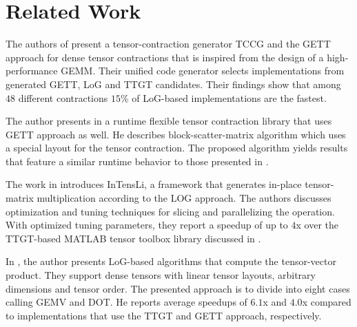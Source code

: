 \section{Related Work}
\label{sec:related}

\begin{comment}
The authors in \cite{dinapoli:2014:towards.efficient.use} discuss the efficient tensor contractions with highly optimized BLAS. 
Based on the LoG approach, they define requirements for the use of \tf{gemm} for class 3 tensor contractions and provide slicing techniques for tensors. %
The slicing recipe for the class 2 categorized tensor contractions contains a short description with a rule of thumb for maximizing performance.
Runtime measurements cover class 3 tensor contractions.
\end{comment}

The authors of \cite{springer:2018:design} present a tensor-contraction generator TCCG and the GETT approach for dense tensor contractions that is inspired from the design of a high-performance GEMM.
Their unified code generator selects implementations from generated GETT, LoG and TTGT candidates.
Their findings show that among $48$ different contractions $15$\% of LoG-based implementations are the fastest.

The author presents in \cite{matthews:2018:high} a runtime flexible tensor contraction library that uses GETT approach as well.
He describes block-scatter-matrix algorithm which uses a special layout for the tensor contraction.
The proposed algorithm yields results that feature a similar runtime behavior to those presented in \cite{springer:2018:design}.

The work in \cite{li:2015:input} introduces InTensLi, a framework that generates in-place tensor-matrix multiplication according to the LOG approach. 
The authors discusses optimization and tuning techniques for slicing and parallelizing the operation.
With optimized tuning parameters, they report a speedup of up to $4$x over the TTGT-based MATLAB tensor toolbox library discussed in \cite{bader:2006:algorithm862}.

In \cite{bassoy:2019:ttv}, the author presents LoG-based algorithms that compute the tensor-vector product. 
They support dense tensors with linear tensor layouts, arbitrary dimensions and tensor order.
The presented approach is to divide into eight cases calling GEMV and DOT.
He reports average speedups of $6.1$x and $4.0$x compared to implementations that use the TTGT and GETT approach, respectively.

